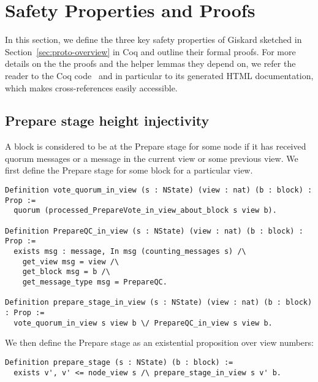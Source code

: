 \documentclass{easychair}
\begin{document}
\section{Safety Properties and Proofs}
\label{sec:safety}

In this section, we define the three key safety properties of Giskard sketched in Section~\ref{sec:proto-overview} in Coq and outline their formal proofs. For more details on the the proofs and the helper lemmas they depend on, we refer the reader to the Coq code~\cite{CoqGiskard} and in particular to its generated HTML documentation, which makes cross-references easily accessible.

\subsection{Prepare stage height injectivity}
A block is considered to be at the Prepare stage for some node if it has received quorum  messages or a  message in the current view or some previous view. We first define the Prepare stage for some block for a particular view.
\begin{lstlisting}[language=Coq]
Definition vote_quorum_in_view (s : NState) (view : nat) (b : block) : Prop :=
  quorum (processed_PrepareVote_in_view_about_block s view b).

Definition PrepareQC_in_view (s : NState) (view : nat) (b : block) : Prop :=
  exists msg : message, In msg (counting_messages s) /\
    get_view msg = view /\
    get_block msg = b /\
    get_message_type msg = PrepareQC.

Definition prepare_stage_in_view (s : NState) (view : nat) (b : block) : Prop :=
  vote_quorum_in_view s view b \/ PrepareQC_in_view s view b.
\end{lstlisting}
We then define the Prepare stage as an existential proposition over view numbers:
\begin{lstlisting}[language=Coq]
Definition prepare_stage (s : NState) (b : block) :=
  exists v', v' <= node_view s /\ prepare_stage_in_view s v' b.
\end{lstlisting}
\end{document}
